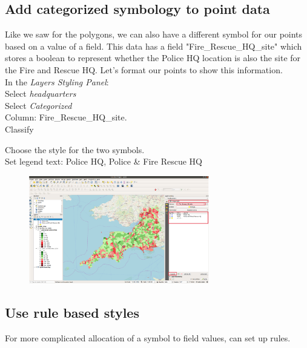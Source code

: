 \null\newpage

\subsection{Add categorized symbology to point data}

Like we saw for the polygons, we can also have a different symbol for our points based on a value of a field. This data has a field "Fire\_Rescue\_HQ\_site" which stores a boolean to represent whether the Police HQ location is also the site for the Fire and Rescue HQ. Let's format our points to show this information.\\

In the \textit{Layers Styling Panel}:\\
Select \textit{headquarters}\\
Select \textit{Categorized}\\
Column: Fire\_Rescue\_HQ\_site.  \\
Classify


Choose the style for the two symbols.\\
Set legend text: Police HQ, Police \& Fire Rescue HQ


\begin{figure}[!h]
	\centering
	\includegraphics[width=0.7\textwidth]{images/point_data_symbology1.png}
	\caption{}
	\label{ft_fig_firstfig3}
\end{figure}

\subsection{Use rule based styles}

For more complicated allocation of a symbol to field values, can set up rules.

